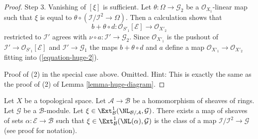 \begin{proof}
\medskip\noindent
Step 3. Vanishing of $[\xi]$ is sufficient. Let
$\theta : \Omega \to \mathcal{G}_2$ be a $\mathcal{O}_{X_1}$-linear map
such that $\xi$ is equal to
$\theta \circ (\mathcal{I}/\mathcal{I}^2 \to \Omega)$.
Then a calculation shows that
$$
b + \theta \circ d : \mathcal{O}_{S'_1}[\mathcal{E}] \to \mathcal{O}_{X'_2}
$$
restricted to $\mathcal{I}'$ agrees with
$\nu \circ a : \mathcal{I}' \to \mathcal{G}_2$. Since $\mathcal{O}_{X'_1}$
is the pushout of $\mathcal{I}' \to \mathcal{O}_{S'_1}[\mathcal{E}]$
and $\mathcal{I}' \to \mathcal{G}_1$ the maps $b + \theta \circ d$
and $a$ define a map
$\mathcal{O}_{X'_1} \to \mathcal{O}_{X'_2}$ fitting into
(\ref{equation-huge-2}).

\medskip\noindent
Proof of (2) in the special case above. Omitted. Hint:
This is exactly the same as the proof of (2) of Lemma \ref{lemma-huge-diagram}.
\end{proof}

\begin{lemma}
\label{lemma-NL-represent-ext-class}
Let $X$ be a topological space. Let $\mathcal{A} \to \mathcal{B}$ be a
homomorphism of sheaves of rings. Let $\mathcal{G}$ be a $\mathcal{B}$-module.
Let
$\xi \in \Ext^1_\mathcal{B}(\NL_{\mathcal{B}/\mathcal{A}}, \mathcal{G})$. 
There exists a map of sheaves of sets $\alpha : \mathcal{E} \to \mathcal{B}$
such that $\xi \in \Ext^1_\mathcal{B}(\NL(\alpha), \mathcal{G})$
is the class of a map $\mathcal{I}/\mathcal{I}^2 \to \mathcal{G}$
(see proof for notation).
\end{lemma}

